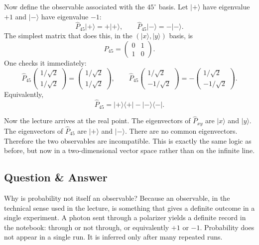 Now define the observable associated with the \(45^\circ\) basis. Let \(|+\rangle\) have eigenvalue \(+1\) and \(|-\rangle\) have eigenvalue \(-1\):
\begin{equation}
\hat P_{45}|+\rangle=+|+\rangle,
\qquad
\hat P_{45}|-\rangle=-|-\rangle.
\end{equation}
The simplest matrix that does this, in the \((|x\rangle,|y\rangle)\) basis, is
\begin{equation}
\hat P_{45}=
\begin{pmatrix}
0 & 1\\
1 & 0
\end{pmatrix}.
\end{equation}
One checks it immediately:
\begin{equation}
\hat P_{45}
\begin{pmatrix}
1/\sqrt2\\
1/\sqrt2
\end{pmatrix}
=
\begin{pmatrix}
1/\sqrt2\\
1/\sqrt2
\end{pmatrix},
\qquad
\hat P_{45}
\begin{pmatrix}
1/\sqrt2\\
-1/\sqrt2
\end{pmatrix}
=
-
\begin{pmatrix}
1/\sqrt2\\
-1/\sqrt2
\end{pmatrix}.
\end{equation}
Equivalently,
\begin{equation}
\hat P_{45}=|+\rangle\langle +|-|-\rangle\langle -|.
\end{equation}

Now the lecture arrives at the real point. The eigenvectors of \(\hat P_{xy}\) are \(|x\rangle\) and \(|y\rangle\). The eigenvectors of \(\hat P_{45}\) are \(|+\rangle\) and \(|-\rangle\). There are no common eigenvectors. Therefore the two observables are incompatible. This is exactly the same logic as before, but now in a two-dimensional vector space rather than on the infinite line.

\subsection{Question \& Answer}

Why is probability not itself an observable? Because an observable, in the technical sense used in the lecture, is something that gives a definite outcome in a single experiment. A photon sent through a polarizer yields a definite record in the notebook: through or not through, or equivalently \(+1\) or \(-1\). Probability does not appear in a single run. It is inferred only after many repeated runs.

